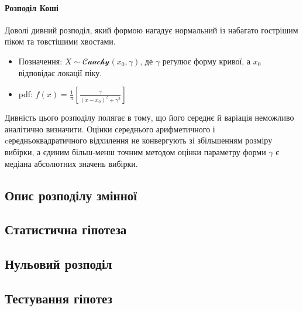 \documentclass[
  11pt,
]{book}
\begin{document}
\paragraph{Розподіл Коші}\label{ux440ux43eux437ux43fux43eux434ux456ux43b-ux43aux43eux448ux456}

Доволі дивний розподіл, який формою нагадує нормальний із набагато гострішим піком та товстішими хвостами.

\begin{itemize}
\item
  Позначення: \(X \sim \mathcal{Cauchy}(x_0, \gamma)\), де \(\gamma\) регулює форму кривої, а \(x_0\) відповідає локації піку.
\item
  pdf: \(f(x) = \frac{1}{\pi} \left[ \frac{\gamma}{(x - x_0)^2 + \gamma^2} \right]\)
\end{itemize}

Дивність цього розподілу полягає в тому, що його середнє й варіація неможливо аналітично визначити. Оцінки середнього арифметичного і cередньоквадратичного відхилення не конвергують зі збільшенням розміру вибірки, а єдиним більш-менш точним методом оцінки параметру форми \(\hat{\gamma}\) є медіана абсолютних значень вибірки.

\subsection{Опис розподілу змінної}\label{ux43eux43fux438ux441-ux440ux43eux437ux43fux43eux434ux456ux43bux443-ux437ux43cux456ux43dux43dux43eux457}

\subsection{Статистична гіпотеза}\label{ux441ux442ux430ux442ux438ux441ux442ux438ux447ux43dux430-ux433ux456ux43fux43eux442ux435ux437ux430}

\subsection{Нульовий розподіл}\label{ux43dux443ux43bux44cux43eux432ux438ux439-ux440ux43eux437ux43fux43eux434ux456ux43b}

\subsection{Тестування гіпотез}\label{ux442ux435ux441ux442ux443ux432ux430ux43dux43dux44f-ux433ux456ux43fux43eux442ux435ux437}
\end{document}
